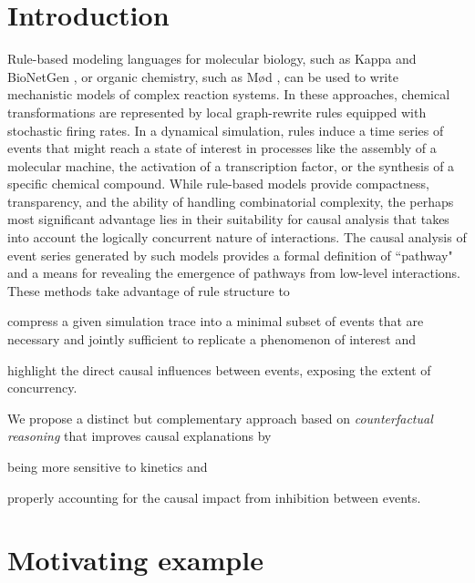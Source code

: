 
\section*{Introduction}\label{intro}

Rule-based modeling languages for molecular biology, such as Kappa \cite{DanosEtAl-CONCUR07} and BioNetGen \cite{bngl}, or organic chemistry, such as M{\o}d \cite{moll}, can be used to write mechanistic models of complex reaction systems. In these approaches, chemical transformations are represented by local graph-rewrite rules equipped with stochastic firing rates. In a dynamical simulation, rules induce a time series of events that might reach a state of interest in processes like the assembly of a molecular machine, the activation of a transcription factor, or the synthesis of a specific chemical compound. While rule-based models provide compactness, transparency, and the ability of handling combinatorial complexity, the perhaps most significant advantage lies in their suitability for causal analysis that takes into account the logically concurrent nature of interactions. The causal analysis \cite{DBLP:conf/fsttcs/DanosFFHH12,DanosEtAl-CONCUR07} of event series generated by such models provides a formal definition of ``pathway" and a means for revealing the emergence of pathways from low-level interactions. These methods take advantage of rule structure to
\begin{inparaenum}[(i)]
\item compress a given simulation trace into a minimal subset of events that are necessary and jointly sufficient to replicate a phenomenon of interest and 
\item highlight the direct causal influences between events, exposing the extent of concurrency. 
\end{inparaenum}

We propose a distinct but complementary approach based on \textit{counterfactual reasoning} that improves causal explanations by 
\begin{inparaenum}[(i)]
\item being more sensitive to kinetics and 
\item properly accounting for the causal impact from inhibition between events.
\end{inparaenum}

\section{Motivating example}\label{example}

